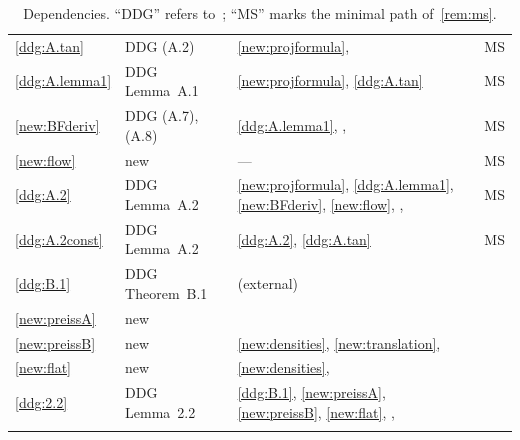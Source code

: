 \documentclass[a4paper,twoside,leqno]{article}
\begin{document}
\begin{longtable}{p{}p{}p{}l}
    \ref{ddg:A.tan} & DDG (A.2) & \ref{new:projformula}, \cite[3.1.19(4), 3.1.21]{Federer1969} &
        MS \\
    \ref{ddg:A.lemma1} & DDG Lemma~A.1 & \ref{new:projformula}, \ref{ddg:A.tan} & MS \\
    \ref{new:BFderiv} & DDG (A.7), (A.8) & \ref{ddg:A.lemma1}, \cite[2.4(1)]{Allard1972},
        \cite[1.7.5, 3.1.11, 3.1.22]{Federer1969} & MS \\
    \ref{new:flow} & new & --- & MS \\
    \ref{ddg:A.2} & DDG Lemma~A.2 & \ref{new:projformula}, \ref{ddg:A.lemma1},
        \ref{new:BFderiv}, \ref{new:flow}, \cite[2.4.9]{Federer1969}, \cite[3.2(1)]{Allard1972} &
        MS \\
    \ref{ddg:A.2const} & DDG Lemma~A.2 & \ref{ddg:A.2}, \ref{ddg:A.tan} & MS \\
    \ref{ddg:B.1} & DDG Theorem~B.1 & \cite[5.3]{Preiss1987} (external) & \\
    \ref{new:preissA} & new & \cite[2.8.18, 2.9.11]{Federer1969} & \\
    \ref{new:preissB} & new & \ref{new:densities}, \ref{new:translation},
        \cite[2.6(2)(c)]{Allard1972} & \\
    \ref{new:flat} & new & \ref{new:densities}, \cite[2.6(2)(a), 3.4, 3.4(1), 3.5,
        3.5(1)(a)]{Allard1972} & \\
    \ref{ddg:2.2} & DDG Lemma~2.2 & \ref{ddg:B.1}, \ref{new:preissA}, \ref{new:preissB},
        \ref{new:flat}, \cite[2.2.5, 2.3.3, 2.10.19(1)(4), 3.1.19, 3.1.21]{Federer1969},
        \cite[2.8(3)(4)(5), 3.5, 3.5(1)(a)]{Allard1972} & \\
    \caption{Dependencies. ``DDG'' refers to~\cite{DePhilippis2018}; ``MS'' marks the minimal
    path of~\ref{rem:ms}.}
    \label{tab:dependencies}
\end{longtable}
\endgroup
\end{document}
